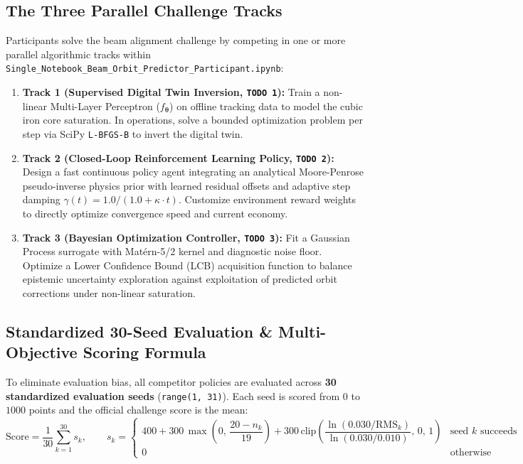 \documentclass[11pt,a4paper]{article}
\begin{document}
\subsection{The Three Parallel Challenge Tracks}
Participants solve the beam alignment challenge by competing in one or more parallel algorithmic tracks within \texttt{Single\_Notebook\_Beam\_Orbit\_Predictor\_Participant.ipynb}:
\begin{enumerate}
    \item \textbf{Track 1 (Supervised Digital Twin Inversion, \texttt{TODO 1}):}
    Train a non-linear Multi-Layer Perceptron ($f_{\boldsymbol{\theta}}$) on offline tracking data to model the cubic iron core saturation. In operations, solve a bounded optimization problem per step via SciPy \texttt{L-BFGS-B} to invert the digital twin.
    
    \item \textbf{Track 2 (Closed-Loop Reinforcement Learning Policy, \texttt{TODO 2}):}
    Design a fast continuous policy agent integrating an analytical Moore-Penrose pseudo-inverse physics prior with learned residual offsets and adaptive step damping $\gamma(t) = 1.0 / (1.0 + \kappa \cdot t)$. Customize environment reward weights to directly optimize convergence speed and current economy.
    
    \item \textbf{Track 3 (Bayesian Optimization Controller, \texttt{TODO 3}):}
    Fit a Gaussian Process surrogate with Mat\'ern-5/2 kernel and diagnostic noise floor. Optimize a Lower Confidence Bound (LCB) acquisition function to balance epistemic uncertainty exploration against exploitation of predicted orbit corrections under non-linear saturation.
\end{enumerate}

\subsection{Standardized 30-Seed Evaluation \& Multi-Objective Scoring Formula}
To eliminate evaluation bias, all competitor policies are evaluated across \textbf{30 standardized evaluation seeds} (\texttt{range(1, 31)}).
Each seed is scored from $0$ to $1000$ points and the official challenge score is the mean:
\begin{equation}
    \text{Score} = \frac{1}{30}\sum_{k=1}^{30} s_k, \qquad
    s_k = \begin{cases}
    400 + 300\,\max\!\left(0,\,\dfrac{20 - n_k}{19}\right) + 300\,\mathrm{clip}\!\left(\dfrac{\ln(0.030/\text{RMS}_k)}{\ln(0.030/0.010)},\,0,\,1\right) & \text{seed } k \text{ succeeds} \\
    0 & \text{otherwise}
    \end{cases}
\end{equation}
\end{document}
